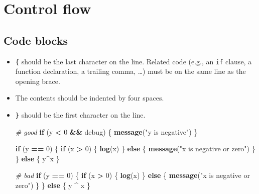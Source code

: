 \documentclass[
]{book}
\newenvironment{Shaded}{\begin{snugshade}}{\end{snugshade}}
\newcommand{\CommentTok}[1]{\textcolor[rgb]{0.56,0.35,0.01}{\textit{#1}}}
\newcommand{\ControlFlowTok}[1]{\textcolor[rgb]{0.13,0.29,0.53}{\textbf{#1}}}
\newcommand{\DecValTok}[1]{\textcolor[rgb]{0.00,0.00,0.81}{#1}}
\newcommand{\KeywordTok}[1]{\textcolor[rgb]{0.13,0.29,0.53}{\textbf{#1}}}
\newcommand{\NormalTok}[1]{#1}
\newcommand{\OperatorTok}[1]{\textcolor[rgb]{0.81,0.36,0.00}{\textbf{#1}}}
\newcommand{\StringTok}[1]{\textcolor[rgb]{0.31,0.60,0.02}{#1}}
\begin{document}
\hypertarget{control-flow}{%
\section{Control flow}\label{control-flow}}

\hypertarget{code-blocks}{%
\subsection{Code blocks}\label{code-blocks}}

\begin{itemize}
\item
  \texttt{\{} should be the last character on the line. Related code (e.g., an \texttt{if}
  clause, a function declaration, a trailing comma, \ldots) must be on the same line
  as the opening brace.
\item
  The contents should be indented by four spaces.
\item
  \texttt{\}} should be the first character on the line.

\begin{Shaded}
\begin{Highlighting}[]
\CommentTok{# good}
\ControlFlowTok{if}\NormalTok{ (y }\OperatorTok{<}\StringTok{ }\DecValTok{0} \OperatorTok{&&}\StringTok{ }\NormalTok{debug) \{}
    \KeywordTok{message}\NormalTok{(}\StringTok{"y is negative"}\NormalTok{)}
\NormalTok{\}}

\ControlFlowTok{if}\NormalTok{ (y }\OperatorTok{==}\StringTok{ }\DecValTok{0}\NormalTok{) \{}
    \ControlFlowTok{if}\NormalTok{ (x }\OperatorTok{>}\StringTok{ }\DecValTok{0}\NormalTok{) \{}
        \KeywordTok{log}\NormalTok{(x)}
\NormalTok{    \} }\ControlFlowTok{else}\NormalTok{ \{}
        \KeywordTok{message}\NormalTok{(}\StringTok{"x is negative or zero"}\NormalTok{)}
\NormalTok{    \}}
\NormalTok{\} }\ControlFlowTok{else}\NormalTok{ \{}
\NormalTok{    y}\OperatorTok{^}\NormalTok{x}
\NormalTok{\}}

\CommentTok{# bad}
\ControlFlowTok{if}\NormalTok{ (y }\OperatorTok{==}\StringTok{ }\DecValTok{0}\NormalTok{)}
\NormalTok{\{}
  \ControlFlowTok{if}\NormalTok{ (x }\OperatorTok{>}\StringTok{ }\DecValTok{0}\NormalTok{) \{}
    \KeywordTok{log}\NormalTok{(x)}
\NormalTok{  \} }\ControlFlowTok{else}\NormalTok{ \{}
\KeywordTok{message}\NormalTok{(}\StringTok{"x is negative or zero"}\NormalTok{)}
\NormalTok{  \}}
\NormalTok{\} }\ControlFlowTok{else}\NormalTok{ \{ y }\OperatorTok{^}\StringTok{ }\NormalTok{x \}}
\end{Highlighting}
\end{Shaded}
\end{itemize}
\end{document}
